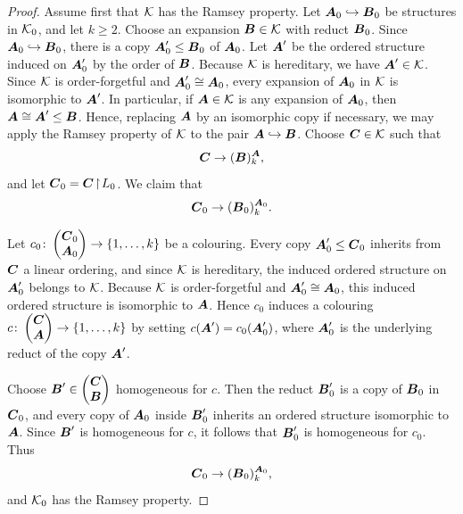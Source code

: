 \begin{proof}
    Assume first that \(\mathcal{K}\) has the Ramsey property. Let \(\boldsymbol{A}_0\hookrightarrow \boldsymbol{B}_0\) be structures in \(\mathcal{K}_0\), and let \(k\geq 2\). Choose an expansion \(\boldsymbol{B}\in\mathcal{K}\) with reduct \(\boldsymbol{B}_0\). Since \(\boldsymbol{A}_0\hookrightarrow \boldsymbol{B}_0\), there is a copy \(\boldsymbol{A}_0'\leq \boldsymbol{B}_0\) of \(\boldsymbol{A}_0\). Let \(\boldsymbol{A}'\) be the ordered structure induced on \(\boldsymbol{A}_0'\) by the order of \(\boldsymbol{B}\). Because \(\mathcal{K}\) is hereditary, we have \(\boldsymbol{A}'\in\mathcal{K}\).
    Since \(\mathcal{K}\) is order-forgetful and \(\boldsymbol{A}_0'\cong \boldsymbol{A}_0\), every expansion of \(\boldsymbol{A}_0\) in \(\mathcal{K}\) is isomorphic to \(\boldsymbol{A}'\). In particular, if \(\boldsymbol{A}\in\mathcal{K}\) is any expansion of \(\boldsymbol{A}_0\), then \(\boldsymbol{A}\cong \boldsymbol{A}'\leq \boldsymbol{B}\).
    Hence, replacing \(\boldsymbol{A}\) by an isomorphic copy if necessary, we may apply the
    Ramsey property of \(\mathcal{K}\) to the pair \(\boldsymbol{A}\hookrightarrow \boldsymbol{B}\). Choose
    \(\boldsymbol{C}\in\mathcal{K}\) such that
    \[
        \boldsymbol{C}\to (\boldsymbol{B})^{\boldsymbol{A}}_k,
    \]
    and let \(\boldsymbol{C}_0=\boldsymbol{C}\!\restriction\!L_0\). We claim that
    \[
        \boldsymbol{C}_0\to (\boldsymbol{B}_0)^{\boldsymbol{A}_0}_k.
    \]

    Let
    \(c_0\colon \begin{pmatrix} \boldsymbol{C}_0 \\ \boldsymbol{A}_0 \end{pmatrix}\to\{1,\dots,k\}\)
    be a colouring. Every copy \(\boldsymbol{A}_0'\leq \boldsymbol{C}_0\) inherits from \(\boldsymbol{C}\) a linear ordering, and since \(\mathcal{K}\) is hereditary, the induced ordered structure on \(\boldsymbol{A}_0'\) belongs to \(\mathcal{K}\). Because \(\mathcal{K}\) is order-forgetful and \(\boldsymbol{A}_0'\cong \boldsymbol{A}_0\), this induced ordered structure is isomorphic to \(\boldsymbol{A}\). Hence \(c_0\) induces a colouring
    \(c\colon \begin{pmatrix} \boldsymbol{C} \\ \boldsymbol{A} \end{pmatrix}\to\{1,\dots,k\}\)
    by setting \(c(\boldsymbol{A}')=c_0(\boldsymbol{A}_0')\),
    where \(\boldsymbol{A}_0'\) is the underlying reduct of the copy \(\boldsymbol{A}'\).

    Choose \(\boldsymbol{B}'\in \begin{pmatrix} \boldsymbol{C} \\ \boldsymbol{B} \end{pmatrix}\)
    homogeneous for \(c\). Then the reduct \(\boldsymbol{B}_0'\) is a copy of \(\boldsymbol{B}_0\) in \(\boldsymbol{C}_0\), and every copy of \(\boldsymbol{A}_0\) inside \(\boldsymbol{B}_0'\) inherits an ordered structure isomorphic to \(\boldsymbol{A}\). Since \(\boldsymbol{B}'\) is homogeneous for \(c\), it follows that \(\boldsymbol{B}_0'\) is homogeneous for \(c_0\). Thus
    \[
        \boldsymbol{C}_0\to (\boldsymbol{B}_0)^{\boldsymbol{A}_0}_k,
    \]
    and \(\mathcal{K}_0\) has the Ramsey property.


\end{proof}
